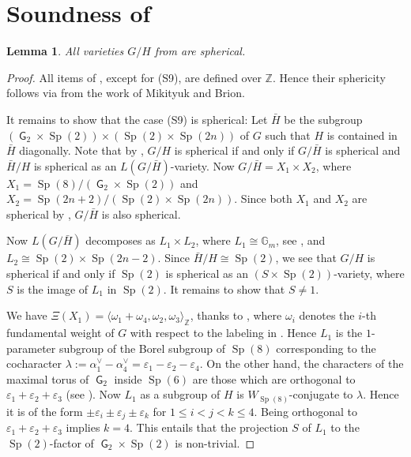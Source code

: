 \documentclass[12pt]{amsart}
\renewcommand{\epsilon}{\varepsilon}
\newcommand\BBZ{{\mathbb Z}}
\newcommand\G{{\operatorname{\mathsf G}}}
\newcommand\Sp{\operatorname{Sp}}
\numberwithin{equation}{section}
\newtheorem{lemma}[lemma]{Lemma}
\theoremstyle{definition}
\begin{document}
\section{Soundness of }

\begin{lemma}
  \label{lem:known}
  All varieties $G/H$ from  are spherical.
\end{lemma}

\begin{proof}
  All items of , except for (S9), are defined over
  $\BBZ$. Hence their sphericity follows via  from
  the work of Mikityuk and Brion.
	
  It remains to show that the case (S9) is spherical: Let $\bar H$ be the
  subgroup $(\G_2 \times \Sp(2)) \times (\Sp(2) \times \Sp(2n))$ of
  $G$ such that $H$ is contained in $\bar H$ diagonally.  Note that by
  , $G/H$ is spherical if and only if $G/ \bar H$ is
  spherical and $\bar H/H$ is spherical as an $L(G/\bar H)$-variety.  Now
  $G/\bar H = X_1 \times X_2$, where
  $X_1 = \Sp(8)/(\G_2 \times \Sp(2))$ and
  $X_2 = \Sp(2n +2 )/(\Sp(2) \times \Sp(2n))$.  Since both $X_1$ and
  $X_2$ are spherical by \cite{KR}, $G/\bar H$ is also spherical.
	
  Now $L(G/\bar H)$ decomposes as $L_1 \times L_2$, where
  $L_1 \cong \mathbb{G}_m$, see \cite[Prop.\ 4.5]{KR}, and
  $L_2 \cong \Sp(2) \times \Sp(2n-2)$. Since $\bar H/H \cong \Sp(2)$,
  we see that $G/H$ is spherical if and only if $\Sp(2)$ is spherical
  as an $(S \times \Sp(2))$-variety, where $S$ is the image of $L_1$
  in $\Sp(2)$. It remains to show that $S \ne 1$.
	
  We have
  $\Xi(X_1)=\langle \omega_1+\omega_4,\omega_2,\omega_3\rangle_\BBZ$,
  thanks to \cite[Prop.\ 4.5]{KR}, where $\omega_i$ denotes the $i$-th
  fundamental weight of $G$ with respect to the labeling in
  \cite[Planche III]{bourbaki:groupes}.  Hence $L_1$ is the
  $1$-parameter subgroup of the Borel subgroup of $\Sp(8)$
  corresponding to the cocharacter
  $\lambda:=\alpha_1^\vee - \alpha_4^\vee = \epsilon_1 - \epsilon_2 -
  \epsilon_4$. On the other hand, the characters of the maximal torus
  of $\G_2$ inside $\Sp(6)$ are those which are
  orthogonal to $\epsilon_1 + \epsilon_2 + \epsilon_3$ (see
  \cite[Planche IX]{bourbaki:groupes}). Now $L_1$ as a subgroup of $H$ is
  $W_{\Sp(8)}$-conjugate to $\lambda$. Hence it is of the form
  $\pm \epsilon_i \pm \epsilon_j \pm \epsilon_k$ for
  $1 \leqslant i < j < k \leqslant 4$. Being orthogonal to
  $\epsilon_1 + \epsilon_2 + \epsilon_3$ implies $k = 4$.  This
  entails that the projection $S$ of $L_1$ to the $\Sp(2)$-factor of
  $\G_2 \times \Sp(2)$ is non-trivial.
\end{proof}
\end{document}
